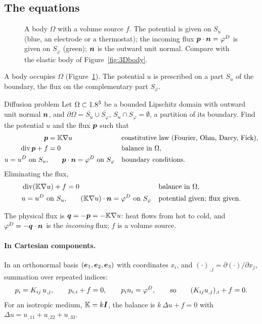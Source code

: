 \subsection{The equations}
\begin{figure}[h]
\centering

\caption{A body $\Omega$ with a volume source $f$. The potential is given on
$S_u$ (blue, an electrode or a thermostat); the incoming flux
$\bm{p}\cdot\bm{n}=\varphi^{D}$ is given on $S_\varphi$ (green); $\bm{n}$ is the outward unit
normal. Compare with the elastic body of Figure~\ref{fig:3Dbody}.}
\label{fig:diff-body}
\end{figure}
A body occupies $\Omega$ (Figure~\ref{fig:diff-body}). The potential $u$ is
prescribed on a part $S_u$ of the boundary, the flux on the complementary
part $S_\varphi$.
\begin{gbox}{Diffusion problem}
Let $\Omega\subset1.8^3$ be a bounded Lipschitz domain with outward unit normal
$\bm{n}$, and $\partial\Omega=\overline{S_u}\cup\overline{S_\varphi}$,
$S_u\cap S_\varphi=\emptyset$, a partition of its boundary. Find the potential
$u$ and the flux $\bm{p}$ such that
\begin{align}
  \bm{p}&=\mathbb{K}\nabla u &&\text{constitutive law (Fourier, Ohm, Darcy, Fick)},\label{eq:diff-law}\\
  \operatorname{div}\bm{p}+f&=0 &&\text{balance in }\Omega,\label{eq:diff-balance}\\
  u=u^{D}\ \text{on }S_u, &\qquad \bm{p}\cdot\bm{n}=\varphi^{D}\ \text{on }S_\varphi
  &&\text{boundary conditions}.\label{eq:diff-bc}
\end{align}
Eliminating the flux,
\begin{align}
  \operatorname{div}(\mathbb{K}\nabla u)+f&=0 &&\text{balance in }\Omega,\label{eq:diffusion}\\
  u=u^{D}\ \text{on }S_u, &\qquad (\mathbb{K}\nabla u)\cdot\bm{n}=\varphi^{D}\ \text{on }S_\varphi
  &&\text{potential given; flux given}.\notag
\end{align}
\end{gbox}
The physical flux is $\bm{q}=-\bm{p}=-\mathbb{K}\nabla u$: heat flows from hot to cold,
and $\varphi^{D}=-\bm{q}\cdot\bm{n}$ is the \emph{incoming} flux; $f$ is a volume source.

\paragraph{In Cartesian components.}
%
In an orthonormal basis $(\bm{e}_1,\bm{e}_2,\bm{e}_3)$ with coordinates $x_i$, and
$(\cdot)_{,j}=\partial(\cdot)/\partial x_j$, summation over repeated indices:
\[
  p_i=K_{ij}\,u_{,j},\qquad p_{i,i}+f=0,\qquad p_in_i=\varphi^{D},
  \qquad\text{so}\qquad (K_{ij}u_{,j})_{,i}+f=0 .
\]
For an isotropic medium, $\mathbb{K}=k\bm{I}$, the balance is $k\,\Delta u+f=0$ with
$\Delta u=u_{,11}+u_{,22}+u_{,33}$.

